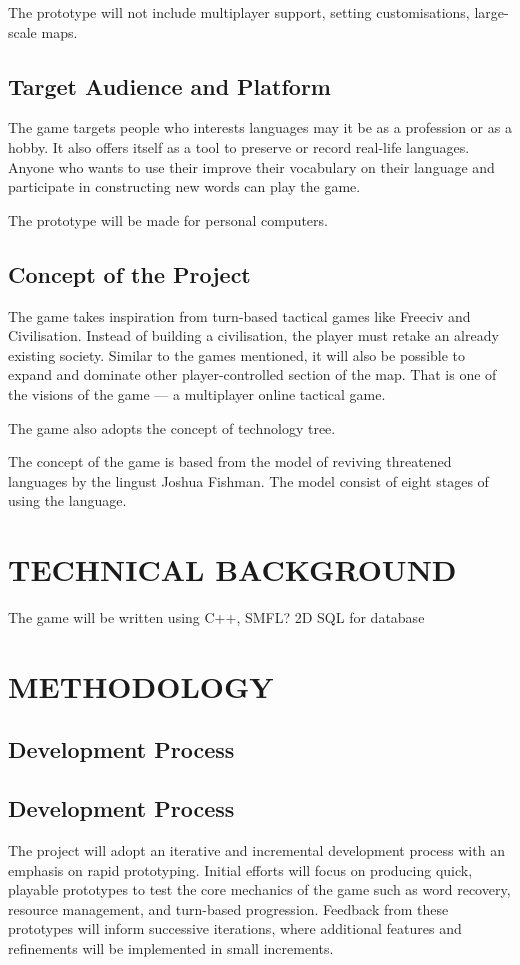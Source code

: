 \documentclass[11pt]{article}
\begin{document}
The prototype will not include multiplayer support, setting customisations, large-scale maps.



\subsection{Target Audience and Platform}
The game targets people who interests languages may it be as a profession or as a hobby. It also offers itself as a tool to preserve or record real-life languages. Anyone who wants to use their improve their vocabulary on their language and participate in constructing new words can play the game.

The prototype will be made for personal computers.

\subsection{Concept of the Project}
The game takes inspiration from turn-based tactical games like Freeciv and Civilisation. Instead of building a civilisation, the player must retake an already existing society. Similar to the games mentioned, it will also be possible to expand and dominate other player-controlled section of the map. That is one of the visions of the game --- a multiplayer online tactical game.

The game also adopts the concept of technology tree. 

The concept of the game is based from the model of reviving threatened languages by the lingust Joshua Fishman. The model consist of eight stages of using the language. 

\section{TECHNICAL BACKGROUND}
The game will be written using C++, SMFL? 2D
SQL for database

\section{METHODOLOGY}
\subsection{Development Process}
\subsection{Development Process}
The project will adopt an iterative and incremental development process with an emphasis on rapid prototyping. 
Initial efforts will focus on producing quick, playable prototypes to test the core mechanics of the game such as word recovery, resource management, and turn-based progression. 
Feedback from these prototypes will inform successive iterations, where additional features and refinements will be implemented in small increments. 
\end{document}

